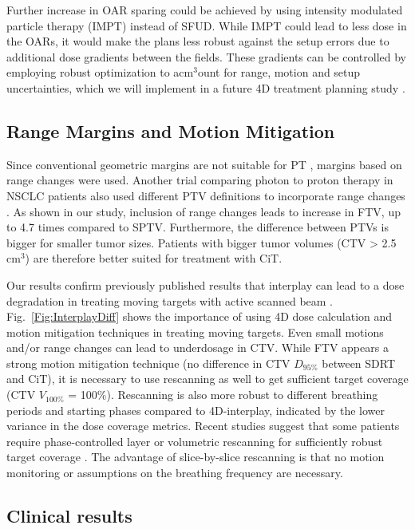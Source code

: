 \documentclass[type=dr, dr=rernat, acm$^3$entcolor=tud7b,colorbacktitle, bigchapter, openright, twoside, 12pt ]{tudthesis}
\begin{document}
Further increase in OAR sparing could be achieved by using intensity modulated particle therapy (IMPT) instead of SFUD. While IMPT could lead to 
less dose in the OARs, it would make the plans less robust against the setup errors due to additional dose gradients between the fields. These gradients can be 
controlled by employing robust optimization to acm$^3$ount for range, motion and setup uncertainties, which we will implement in a future 4D treatment planning study \cite{Chen2012}.

\subsection{Range Margins and Motion Mitigation}

Since conventional geometric margins are not suitable for PT \cite{Park2012}, margins based on range changes were used. Another trial comparing photon to proton therapy in
NSCLC patients also used different PTV definitions to incorporate range changes \cite{Roelofs2012}. As shown in our study, inclusion of range changes leads to increase in FTV,
up to 4.7 times compared to SPTV. Furthermore, the difference between PTVs is bigger for smaller tumor sizes. Patients with bigger tumor volumes (CTV > 2.5 cm$^3$) 
are therefore better suited for treatment with CiT. 

Our results confirm previously published results that interplay can lead to a dose degradation in treating moving targets with active scanned beam \cite{Bert2008}. 
Fig.~\ref{Fig:InterplayDiff} shows the importance of using 4D dose calculation and motion mitigation techniques in treating moving targets. Even small motions and/or range 
changes can lead to underdosage in CTV. While FTV appears a strong motion mitigation technique (no difference in CTV $D_{95\%}$ between SDRT and CiT), 
it is necessary to use rescanning as well to get sufficient target coverage (CTV $V_{100\%}$ = 100\%). Rescanning is also more robust to different breathing
periods and starting phases compared to 4D-interplay, indicated by the lower variance in the dose coverage metrics. Recent studies suggest that some 
patients require phase-controlled layer or volumetric rescanning for sufficiently robust target coverage \cite{Mori2013,Takahashi2014}. The advantage of slice-by-slice 
rescanning is that no motion monitoring or assumptions on the breathing frequency are necessary.

\subsection{Clinical results}
\end{document}
